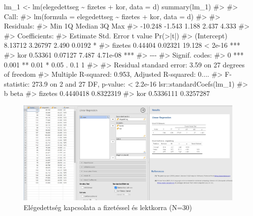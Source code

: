 \documentclass[
  letterpaper,
]{krantz}
\makeatletter
\newenvironment{Shaded}{\begin{snugshade}}{\end{snugshade}}
\newcommand{\AttributeTok}[1]{\textcolor[rgb]{0.40,0.45,0.13}{#1}}
\newcommand{\CommentTok}[1]{\textcolor[rgb]{0.37,0.37,0.37}{#1}}
\newcommand{\FunctionTok}[1]{\textcolor[rgb]{0.28,0.35,0.67}{#1}}
\newcommand{\NormalTok}[1]{\textcolor[rgb]{0.00,0.23,0.31}{#1}}
\newcommand{\OtherTok}[1]{\textcolor[rgb]{0.00,0.23,0.31}{#1}}
\newcommand{\SpecialCharTok}[1]{\textcolor[rgb]{0.37,0.37,0.37}{#1}}
\newenvironment{kframe}{%
\medskip{}
\setlength{\fboxsep}{.8em}
 \def\at@end@of@kframe{}%
 \ifinner\ifhmode%
  \def\at@end@of@kframe{\end{minipage}}%
  \begin{minipage}{\columnwidth}%
 \fi\fi%
 \def\FrameCommand##1{\hskip\@totalleftmargin \hskip-\fboxsep
 \colorbox{shadecolor}{##1}\hskip-\fboxsep
     \hskip-\linewidth \hskip-\@totalleftmargin \hskip\columnwidth}%
 \MakeFramed {\advance\hsize-\width
   \@totalleftmargin\z@ \linewidth\hsize
   \@setminipage}}%
 {\par\unskip\endMakeFramed%
 \at@end@of@kframe}
\renewenvironment{Shaded}{\begin{kframe}}{\end{kframe}}
\makeatother
\begin{document}
\begin{Shaded}
\begin{Highlighting}[]
\NormalTok{lm\_1 }\OtherTok{\textless{}{-}} \FunctionTok{lm}\NormalTok{(elegedettseg }\SpecialCharTok{\textasciitilde{}}\NormalTok{ fizetes }\SpecialCharTok{+}\NormalTok{ kor, }\AttributeTok{data =}\NormalTok{ d)}
\FunctionTok{summary}\NormalTok{(lm\_1)}
\CommentTok{\#\textgreater{} }
\CommentTok{\#\textgreater{} Call:}
\CommentTok{\#\textgreater{} lm(formula = elegedettseg \textasciitilde{} fizetes + kor, data = d)}
\CommentTok{\#\textgreater{} }
\CommentTok{\#\textgreater{} Residuals:}
\CommentTok{\#\textgreater{}     Min      1Q  Median      3Q     Max }
\CommentTok{\#\textgreater{} {-}10.248  {-}1.543   1.188   2.437   4.333 }
\CommentTok{\#\textgreater{} }
\CommentTok{\#\textgreater{} Coefficients:}
\CommentTok{\#\textgreater{}             Estimate Std. Error t value Pr(\textgreater{}|t|)    }
\CommentTok{\#\textgreater{} (Intercept)  8.13712    3.26797   2.490   0.0192 *  }
\CommentTok{\#\textgreater{} fizetes      0.44404    0.02321  19.128  \textless{} 2e{-}16 ***}
\CommentTok{\#\textgreater{} kor          0.53361    0.07127   7.487 4.71e{-}08 ***}
\CommentTok{\#\textgreater{} {-}{-}{-}}
\CommentTok{\#\textgreater{} Signif. codes:  }
\CommentTok{\#\textgreater{} 0 \textquotesingle{}***\textquotesingle{} 0.001 \textquotesingle{}**\textquotesingle{} 0.01 \textquotesingle{}*\textquotesingle{} 0.05 \textquotesingle{}.\textquotesingle{} 0.1 \textquotesingle{} \textquotesingle{} 1}
\CommentTok{\#\textgreater{} }
\CommentTok{\#\textgreater{} Residual standard error: 3.59 on 27 degrees of freedom}
\CommentTok{\#\textgreater{} Multiple R{-}squared:  0.953,  Adjusted R{-}squared:  0....}
\CommentTok{\#\textgreater{} F{-}statistic: 273.9 on 2 and 27 DF,  p{-}value: \textless{} 2.2e{-}16}
\NormalTok{lsr}\SpecialCharTok{::}\FunctionTok{standardCoefs}\NormalTok{(lm\_1)}
\CommentTok{\#\textgreater{}                 b      beta}
\CommentTok{\#\textgreater{} fizetes 0.4440418 0.8322319}
\CommentTok{\#\textgreater{} kor     0.5336111 0.3257287}
\end{Highlighting}
\end{Shaded}

\begin{figure}

{\centering \includegraphics{./images/lin_reg_elegedettseg_kep_01.jpg}

}

\caption{Elégedettség kapcsolata a fizetéssel és lektkorra (N=30)}

\end{figure}
\end{document}
